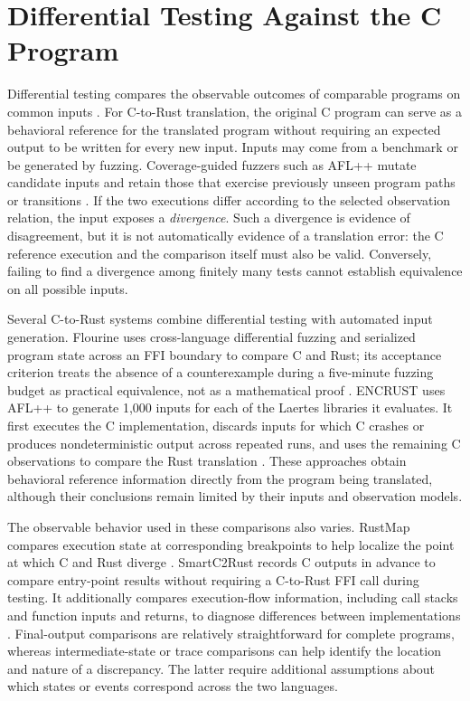 \section{Differential Testing Against the C Program}
\label{sec:rw-differential}\label{sec:rw-equivalence}

Differential testing compares the observable outcomes of comparable
programs on common inputs \cite{mckeeman1998differential}. For C-to-Rust
translation, the original C program can serve as a behavioral reference
for the translated program without requiring an expected output to be
written for every new input. Inputs may come from a benchmark or be
generated by fuzzing. Coverage-guided fuzzers such as AFL++ mutate
candidate inputs and retain those that exercise previously unseen
program paths or transitions \cite{fioraldi2020aflpp,aflpp-docs}. If the
two executions differ according to the selected observation relation,
the input exposes a \emph{divergence}. Such a divergence is evidence of
disagreement, but it is not automatically evidence of a translation
error: the C reference execution and the comparison itself must also be
valid. Conversely, failing to find a divergence among finitely many
tests cannot establish equivalence on all possible inputs.

Several C-to-Rust systems combine differential testing with automated
input generation. Flourine uses cross-language differential fuzzing and
serialized program state across an FFI boundary to compare C and Rust;
its acceptance criterion treats the absence of a counterexample during a
five-minute fuzzing budget as practical equivalence, not as a
mathematical proof \cite{eniser2024flourine}. ENCRUST uses AFL++ to
generate 1,000 inputs for each of the Laertes libraries it evaluates. It
first executes the C implementation, discards inputs for which C crashes
or produces nondeterministic output across repeated runs, and uses the
remaining C observations to compare the Rust translation
\cite{sim2026encrust}. These approaches obtain behavioral reference
information directly from the program being translated, although their
conclusions remain limited by their inputs and observation models.

The observable behavior used in these comparisons also varies. RustMap
compares execution state at corresponding breakpoints to help localize
the point at which C and Rust diverge \cite{cai2025rustmap}. SmartC2Rust
records C outputs in advance to compare entry-point results without
requiring a C-to-Rust FFI call during testing. It additionally compares
execution-flow information, including call stacks and function inputs
and returns, to diagnose differences between implementations
\cite{shiraishi2026smartc2rust}. Final-output comparisons are relatively
straightforward for complete programs, whereas intermediate-state or
trace comparisons can help identify the location and nature of a
discrepancy. The latter require additional assumptions about which
states or events correspond across the two languages.

